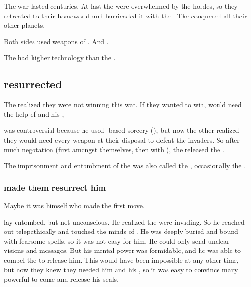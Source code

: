 The war lasted centuries. 
At last the \ophidians were overwhelmed by the \bane hordes, so they retreated to their homeworld and barricaded it with the \CrystalSphere. 
The \banes conquered all their other planets. 

Both sides used weapons of . 
And . 

The \ophidians had higher technology than the \banes. 








\subsection{\Sethicus resurrected}
The \ophidians realized they were not winning this war.
If they wanted to win, would need the help of \Sethicus and his \dragons, . 

 was controversial because he used \xs-based sorcery (), but now the other \ophidians{} realized they would need every weapon at their disposal to defeat the \bane{} invaders. 
So after much negotation (first amongst themselves, then with \Sethicus), the \ophidians released the \dragons. 

The imprisonment and entombment of the \dragons was also called the , occasionally the .




\subsubsection{\Sethicus made them resurrect him}
Maybe it was \Sethicus himself who made the first move. 

\Sethicus lay entombed, but not unconscious.
He realized the \banes were invading.
So he reached out telepathically and touched the minds of \ophidians.
He was deeply buried and bound with fearsome spells, so it was not easy for him.
He could only send unclear visions and messages.
But his mental power was formidable, and he was able to compel the \ophidians to release him.
This would have been impossible at any other time, but now they knew they needed him and his \dragons, so it was easy to convince many powerful \ophidians to come and release his seals.





